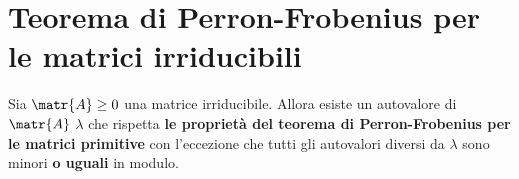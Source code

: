 \documentclass[\main/main.tex]{subfiles}
\begin{document}
\section{Teorema di Perron-Frobenius per le matrici irriducibili}
\begin{theorem}
  Sia \(\matr{A} \geq 0\) una matrice irriducibile. Allora esiste un autovalore di \(\matr{A}\) \(\lambda \) che rispetta \textbf{le proprietà del teorema di Perron-Frobenius per le matrici primitive} con l'eccezione che tutti gli autovalori diversi da \(\lambda \) sono minori \textbf{o uguali} in modulo.
\end{theorem}
\end{document}
